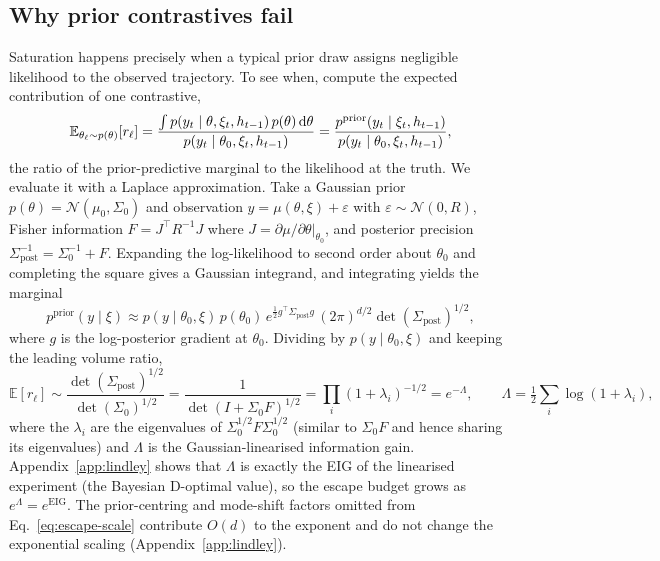 \subsection{Why prior contrastives fail}
\label{sec:m-escape}

Saturation happens precisely when a typical prior draw assigns negligible likelihood
to the observed trajectory. To see when, compute the expected contribution of one
contrastive,
\begin{equation}
\label{eq:Er}
\mathbb{E}_{\theta_\ell\sim p(\theta)}[r_\ell]
= \frac{\int p(y_t\mid\theta,\xi_t,h_{t-1})\,p(\theta)\,\mathrm{d}\theta}{p(y_t\mid\theta_0,\xi_t,h_{t-1})}
= \frac{p^{\mathrm{prior}}(y_t\mid\xi_t,h_{t-1})}{p(y_t\mid\theta_0,\xi_t,h_{t-1})},
\end{equation}
the ratio of the prior-predictive marginal to the likelihood at the truth. We
evaluate it with a Laplace approximation. Take a Gaussian prior
$p(\theta)=\mathcal N(\mu_0,\Sigma_0)$ and observation $y=\mu(\theta,\xi)+\varepsilon$
with $\varepsilon\sim\mathcal N(0,R)$, Fisher information $F=J^\top R^{-1}J$ where
$J=\partial\mu/\partial\theta|_{\theta_0}$, and posterior precision
$\Sigma_{\mathrm{post}}^{-1}=\Sigma_0^{-1}+F$. Expanding the log-likelihood to second
order about $\theta_0$ and completing the square gives a Gaussian integrand, and
integrating yields the marginal
\begin{equation}
\label{eq:laplace-marginal}
p^{\mathrm{prior}}(y\mid\xi)\approx p(y\mid\theta_0,\xi)\,p(\theta_0)\,e^{\frac12 g^\top\Sigma_{\mathrm{post}}g}\,(2\pi)^{d/2}\det(\Sigma_{\mathrm{post}})^{1/2},
\end{equation}
where $g$ is the log-posterior gradient at $\theta_0$. Dividing by
$p(y\mid\theta_0,\xi)$ and keeping the leading volume ratio,
\begin{equation}
\label{eq:escape-scale}
\mathbb{E}[r_\ell]\sim\frac{\det(\Sigma_{\mathrm{post}})^{1/2}}{\det(\Sigma_0)^{1/2}}
=\frac{1}{\det(I+\Sigma_0 F)^{1/2}}=\prod_i(1+\lambda_i)^{-1/2}=e^{-\Lambda},
\qquad \Lambda=\tfrac12\sum_i\log(1+\lambda_i),
\end{equation}
where the $\lambda_i$ are the eigenvalues of $\Sigma_0^{1/2}F\Sigma_0^{1/2}$ (similar
to $\Sigma_0 F$ and hence sharing its eigenvalues) and $\Lambda$ is the
Gaussian-linearised information gain. Appendix~\ref{app:lindley} shows that $\Lambda$ is
exactly the EIG of the linearised experiment (the Bayesian D-optimal value), so the
escape budget grows as $e^{\Lambda}=e^{\mathrm{EIG}}$. The prior-centring and mode-shift
factors omitted from Eq.~\eqref{eq:escape-scale}
contribute $O(d)$ to the exponent and do not change the exponential scaling
(Appendix~\ref{app:lindley}).

